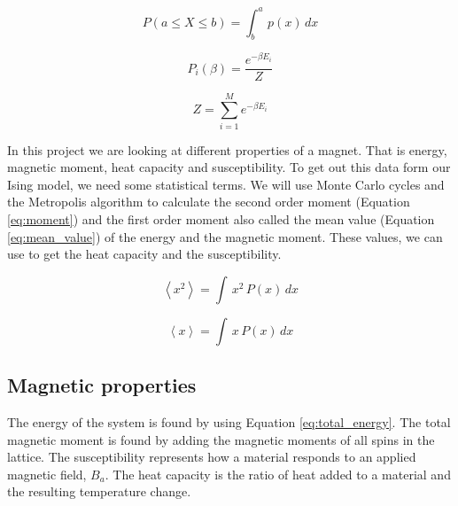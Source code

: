 \begin{equation}\label{eq:probability_density}
P(a\leq X \leq b) = \int_b^a\, p(x)\, dx
\end{equation}

\begin{equation}\label{eq:Boltzmann}
P_i(\beta) = \frac{e^{-\beta E_i}}{Z}
\end{equation}

\begin{equation}\label{eq:Partitionfunction}
Z = \sum_{i=1}^M e^{-\beta E_i}
\end{equation}

In this project we are looking at different properties of a magnet. That is energy, magnetic moment, heat capacity and susceptibility. To get out this data form our Ising model, we need some statistical terms. We will use Monte Carlo cycles and the Metropolis algorithm to calculate the second order moment (Equation \ref{eq:moment}) and the first order moment also called the mean value (Equation \ref{eq:mean_value}) of the energy and the magnetic moment. These values, we can use to get the heat capacity and the susceptibility.

\begin{equation}\label{eq:moment}
\left< x^2 \right> = \int \,x^2 \,P(x)\,dx
\end{equation}

\begin{equation}\label{eq:mean_value}
\left< x \right> = \int \,x \,P(x)\,dx
\end{equation}

\subsection{Magnetic properties}

The energy of the system is found by using Equation \ref{eq:total_energy}. The total magnetic moment is found by adding the magnetic moments of all spins in the lattice. The susceptibility represents how a material responds to an applied magnetic field, $B_a$. The heat capacity is the ratio of heat added to a material and the resulting temperature change.

